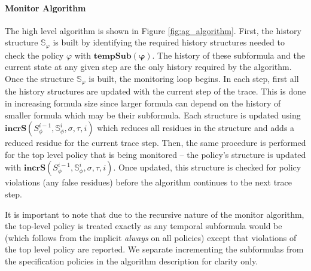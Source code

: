 \documentclass[]{../llncs/llncs}
\begin{document}
\paragraph{Monitor Algorithm}
The high level algorithm is shown in Figure \ref{fig:ag_algorithm}. First, the history structure $\mathbb{S}_{\varphi}$ is built by identifying the required history structures needed to check the policy $\varphi$ with $\mathbf{tempSub(\varphi)}$. 
The history of these subformula and the current state at any given step are the only history required by the algorithm. Once the structure $\mathbb{S}_{\varphi}$ is built, the monitoring loop begins. 
In each step, first all the history structures are updated with the current step of the trace. This is done in increasing formula size since larger formula can depend on the history of smaller formula which may be their subformula.
Each structure is updated using $\mathbf{incrS}(S^{i-1}_\phi,\mathbb{S}^i_\phi,\sigma,\tau,i)$ which reduces all residues in the structure and adds a reduced residue for the current trace step. 
Then, the same procedure is performed for the top level policy that is being monitored -- the policy's structure is updated with $\mathbf{incrS}(S^{i-1}_\phi,\mathbb{S}^i_\phi,\sigma,\tau,i)$.
Once updated, this structure is checked for policy violations (any false residues) before the algorithm continues to the next trace step.

It is important to note that due to the recursive nature of the monitor algorithm, the top-level policy is treated exactly as any temporal subformula would be (which follows from the implicit \emph{always} on all policies) except that violations of the top level policy are reported. We separate incrementing the subformulas from the specification policies in the algorithm description for clarity only.
\end{document}

